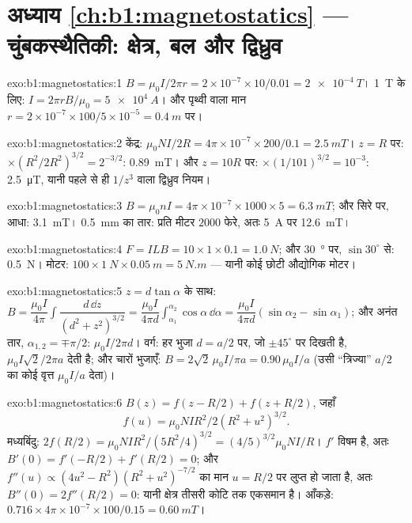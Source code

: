 \section*{अध्याय \ref{ch:b1:magnetostatics} --- चुंबकस्थैतिकी: क्षेत्र, बल और द्विध्रुव}

\begin{solution}{exo:b1:magnetostatics:1}
$B = \mu_0I/2\pi r = 2 \times 10^{-7} \times 10/0.01 = \qty{2e-4}{T}$। \qty{1}{T} के लिए:
$I = 2\pi rB/\mu_0 = \qty{5e4}{A}$। और पृथ्वी वाला मान $r = 2 \times 10^{-7} \times
100/5 \times 10^{-5} = \qty{0.4}{m}$ पर।
\end{solution}

\begin{solution}{exo:b1:magnetostatics:2}
केंद्र: $\mu_0NI/2R = 4\pi \times 10^{-7} \times 200/0.1 = \qty{2.5}{mT}$। $z = R$ पर:
$\times(R^2/2R^2)^{3/2} = 2^{-3/2}$: \qty{0.89}{mT}। और $z = 10R$ पर: $\times(1/101)^{3/2}
= 10^{-3}$: \qty{2.5}{\micro T}, यानी पहले से ही $1/z^3$ वाला द्विध्रुव नियम।
\end{solution}

\begin{solution}{exo:b1:magnetostatics:3}
$B = \mu_0nI = 4\pi \times 10^{-7} \times 1000 \times 5 = \qty{6.3}{mT}$; और सिरे पर,
आधा: \qty{3.1}{mT}। \qty{0.5}{mm} का तार: प्रति मीटर $2000$ फेरे, अतः
\qty{5}{A} पर \qty{12.6}{mT}।
\end{solution}

\begin{solution}{exo:b1:magnetostatics:4}
$F = ILB = 10 \times 1 \times 0.1 = \qty{1.0}{N}$; और \qty{30}{\degree} पर, $\sin30^\circ$ से:
\qty{0.5}{N}। मोटर: $100 \times \qty{1}{N} \times \qty{0.05}{m} = \qty{5}{N.m}$ ---
यानी कोई छोटी औद्योगिक मोटर।
\end{solution}

\begin{solution}{exo:b1:magnetostatics:5}
$z = d\tan\alpha$ के साथ: $B = \dfrac{\mu_0I}{4\pi}\displaystyle\int\dfrac{d\,\dd z}{(d^2 + z^2)^{3/2}}
= \dfrac{\mu_0I}{4\pi d}\displaystyle\int_{\alpha_1}^{\alpha_2}\cos\alpha\,\dd\alpha = \dfrac{\mu_0I}{4\pi d}
(\sin\alpha_2 - \sin\alpha_1)$; और अनंत तार, $\alpha_{1,2} = \mp\pi/2$: $\mu_0I/2\pi d$।
वर्ग: हर भुजा $d = a/2$ पर, जो $\pm45^\circ$ पर दिखती है, $\mu_0I\sqrt2/2\pi a$ देती है;
और चारों भुजाएँ: $B = 2\sqrt2\,\mu_0I/\pi a = 0.90\,\mu_0I/a$ (उसी
``त्रिज्या'' $a/2$ का कोई वृत्त $\mu_0I/a$ देता)।
\end{solution}

\begin{solution}{exo:b1:magnetostatics:6}
$B(z) = f(z - R/2) + f(z + R/2)$, जहाँ
\[
f(u) = \mu_0NIR^2/2(R^2 + u^2)^{3/2} .
\]
मध्यबिंदु: $2f(R/2) = \mu_0NIR^2/(5R^2/4)^{3/2} = (4/5)^{3/2}\mu_0NI/R$। $f'$
विषम है, अतः $B'(0) = f'(-R/2) + f'(R/2) = 0$;
और $f''(u) \propto (4u^2 - R^2)(R^2 + u^2)^{-7/2}$ का मान
$u = R/2$ पर लुप्त हो जाता है, अतः $B''(0) = 2f''(R/2) = 0$: यानी
क्षेत्र तीसरी कोटि तक एकसमान है। आँकड़े: $0.716 \times 4\pi \times 10^{-7} \times 100/0.15 =
\qty{0.60}{mT}$।
\end{solution}

